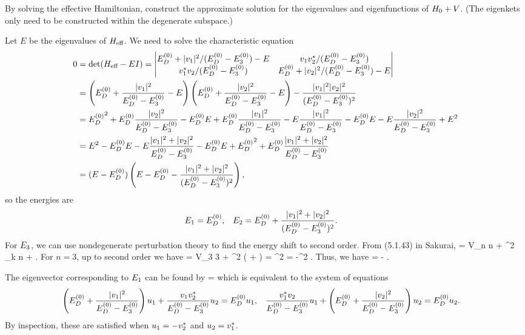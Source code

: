 \newcommand{\uq}{u_1}
\newcommand{\uw}{u_2}
\newcommand{\wq}{w_1}
\newcommand{\ww}{w_2}

\begin{problem}
	By solving the effective Hamiltonian, construct the approximate solution for the eigenvalues and eigenfunctions of $H_0 + V$.  (The eigenkets only need to be constructed within the degenerate subspace.)
\end{problem}

\begin{solution}
	Let $E$ be the eigenvalues of $H_\text{eff}$.  We need to solve the characteristic equation
	\begin{align*}
		0 &= \det(\Heff - E I)
		= \vmqty{ \Eod + |\vq|^2/(\Eod - \Eoe) - E & \vq \vws / (\Eod - \Eoe) \\ \vqs \vw / (\Eod - \Eoe) & \Eod + |\vw|^2/(\Eod - \Eoe) - E } \\
		&= \left( \Eod + \frac{|\vq|^2}{\Eod - \Eoe} - E \right) \left( \Eod + \frac{|\vw|^2}{\Eod - \Eoe} - E \right) - \frac{|\vq|^2 |\vw|^2}{(\Eod - \Eoe)^2} \\
		&= {\Eod}^2 + \Eod \frac{|\vw|^2}{\Eod - \Eoe} - \Eod E + \Eod \frac{|\vq|^2}{\Eod - \Eoe} - E \frac{|\vq|^2}{\Eod - \Eoe} - \Eod E - E \frac{|\vw|^2}{\Eod - \Eoe} + E^2 \\
		&= E^2 - \Eod E - E \frac{|\vq|^2 + |\vw|^2}{\Eod - \Eoe} - \Eod E + {\Eod}^2 + \Eod \frac{|\vq|^2 + |\vw|^2}{\Eod - \Eoe} \\
		&= (E - \Eod) \left( E - \Eod - \frac{|\vq|^2 + |\vw|^2}{(\Eod - \Eoe)^2} \right),
	\end{align*}
	so the energies are
	\begin{align*}
		E_1 &= E^{(0)}_D, &
		E_2 &= E^{(0)}_D + \frac{|v_1|^2 + |v_2|^2}{(E^{(0)}_D - E^{(0)}_3)^2}.
	\end{align*}
	For $E_3$, we can use nondegenerate perturbation theory to find the energy shift to second order.  From (5.1.43) in Sakurai,
	\beq
		\Deln = \lam V_{n n} + \lam^2 \sum_{k \neq n}  + \cdots.
	\eeq
	For $n = 3$, up to second order we have
	\beq
		\Dele = \lam V_{3 3} + \lam^2 \left(  +  \right)
		= \lam^2 
		= -\lam^2 .
	\eeq
	Thus, we have
	\beq
		\Ee = \Eoe - .
	\eeq
	
	The eigenvector corresponding to $E_1$ can be found by
	\beq
		 \mqty[ \uq \\ \uw ] = \Eod \mqty[ \uq \\ \uw ]
	\eeq
	which is equivalent to the system of equations
	\begin{align*}
		\left( \Eod + \frac{|\vq|^2}{\Eod - \Eoe} \right) \uq + \frac{\vq \vws}{\Eod - \Eoe} \uw &= \Eod \uq, &
		\frac{\vqs \vw}{\Eod - \Eoe} \uq + \left( \Eod + \frac{|\vw|^2}{\Eod - \Eoe} \right) \uw &= \Eod \uw.
	\end{align*}
	By inspection, these are satisfied when $\uq = -\vws$ and $\uw = \vqs$.
	

\end{solution}
